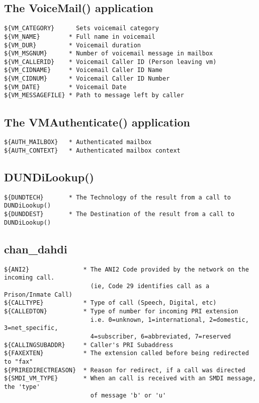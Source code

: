 \subsection{The VoiceMail() application}
\begin{verbatim}
${VM_CATEGORY}      Sets voicemail category
${VM_NAME}        * Full name in voicemail
${VM_DUR}         * Voicemail duration
${VM_MSGNUM}      * Number of voicemail message in mailbox
${VM_CALLERID}    * Voicemail Caller ID (Person leaving vm)
${VM_CIDNAME}     * Voicemail Caller ID Name
${VM_CIDNUM}      * Voicemail Caller ID Number
${VM_DATE}        * Voicemail Date
${VM_MESSAGEFILE} * Path to message left by caller
\end{verbatim}

\subsection{The VMAuthenticate() application}
\begin{verbatim}
${AUTH_MAILBOX}   * Authenticated mailbox
${AUTH_CONTEXT}   * Authenticated mailbox context
\end{verbatim}

\subsection{DUNDiLookup()}
\begin{verbatim}
${DUNDTECH}       * The Technology of the result from a call to DUNDiLookup()
${DUNDDEST}       * The Destination of the result from a call to DUNDiLookup()
\end{verbatim}

\subsection{chan\_dahdi}
\begin{verbatim}
${ANI2}               * The ANI2 Code provided by the network on the incoming call.
                        (ie, Code 29 identifies call as a Prison/Inmate Call)
${CALLTYPE}           * Type of call (Speech, Digital, etc)
${CALLEDTON}          * Type of number for incoming PRI extension
                        i.e. 0=unknown, 1=international, 2=domestic, 3=net_specific,
                        4=subscriber, 6=abbreviated, 7=reserved
${CALLINGSUBADDR}     * Caller's PRI Subaddress
${FAXEXTEN}           * The extension called before being redirected to "fax"
${PRIREDIRECTREASON}  * Reason for redirect, if a call was directed
${SMDI_VM_TYPE}       * When an call is received with an SMDI message, the 'type'
                        of message 'b' or 'u'
\end{verbatim}

